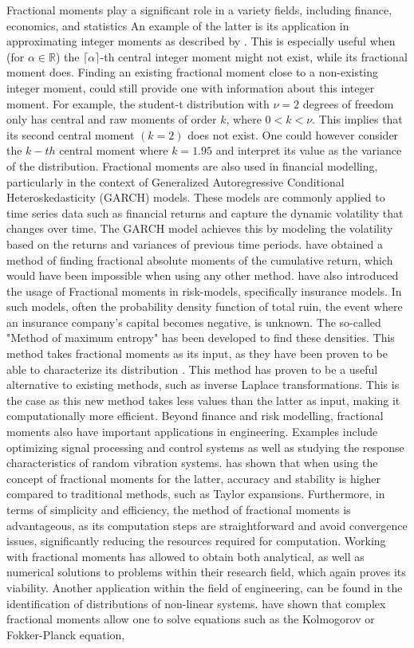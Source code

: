 Fractional moments play a significant role in a variety fields, including finance, economics, and statistics An example of the latter is its application in approximating integer moments as described by \cite{inverardi2024}. This is especially useful when (for \(\alpha \in \mathbb{R}\)) the \(\lceil\alpha \rceil\)-th central integer moment might not exist, while its fractional moment does. Finding an existing fractional moment close to a non-existing integer moment, could still provide one with information about this integer moment. For example, the student-t distribution with \(\nu = 2\) degrees of freedom only has central and raw moments of order \(k\), where \( 0 < k < \nu\). This implies that its second central moment \((k = 2)\) does not exist. One could however consider the \(k-th\) central moment where \(k = 1.95\) and interpret its value as the variance of the distribution. Fractional moments are also used in financial modelling, particularly in the context of Generalized Autoregressive Conditional Heteroskedasticity (GARCH) models. These models are commonly applied to time series data such as financial returns and capture the dynamic volatility that changes over time. The GARCH model achieves this by modeling the volatility based on the returns and variances of previous time periods. \cite{hansen2024} have obtained a method of finding fractional absolute moments of the cumulative return, which would have been impossible when using any other method. \cite{gyzl2013} have also introduced the usage of Fractional moments in risk-models, specifically insurance models. In such models, often the probability density function of total ruin, the event where an insurance company's capital becomes negative, is unknown. The so-called "Method of maximum entropy" has been developed to find these densities. This method takes fractional moments as its input, as they have been proven to be able to characterize its distribution \cite{lin1992}. This method has proven to be a useful alternative to existing methods, such as inverse Laplace transformations. This is the case as this new method takes less values than the latter as input, making it computationally more efficient. Beyond finance and risk modelling, fractional moments also have important applications in engineering. Examples include optimizing signal processing and control systems as well as studying the response characteristics of random vibration systems. \cite{wang2025} has shown that when using the concept of fractional moments for the latter, accuracy and stability is higher compared to traditional methods, such as Taylor expansions. Furthermore, in terms of simplicity and efficiency, the method of fractional moments is advantageous, as its computation steps are straightforward and avoid convergence issues, significantly reducing the resources required for computation. Working with fractional moments has allowed \cite{wang2025} to obtain both analytical, as well as numerical solutions to problems within their research field, which again proves its viability. Another application within the field of engineering, can be found in the identification of distributions of non-linear systems. \cite{dimatteo2014} have shown that complex fractional moments allow one to solve equations such as the Kolmogorov or Fokker-Planck equation, 